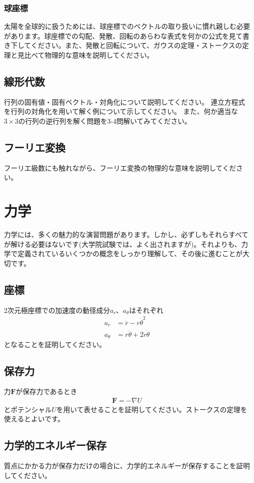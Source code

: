 \documentclass{ltjarticle}
\begin{document}
\subsubsection{球座標}
太陽を全球的に扱うためには、球座標でのベクトルの取り扱いに慣れ親しむ必要があります。球座標での勾配、発散、回転のあらわな表式を何かの公式を見て書き下してください。また、発散と回転について、ガウスの定理・ストークスの定理と見比べて物理的な意味を説明してください。
\subsection{線形代数}
行列の固有値・固有ベクトル・対角化について説明してください。
連立方程式を行列の対角化を用いて解く例について示してください。
また、何か適当な$3\times3$の行列の逆行列を解く問題を3-4問解いてみてください。
\subsection{フーリエ変換}
フーリエ級数にも触れながら、フーリエ変換の物理的な意味を説明してください。
\section{力学}
力学には、多くの魅力的な演習問題があります。しかし、必ずしもそれらすべてが解ける必要はないです(大学院試験では、よく出されますが)。それよりも、力学で定義されているいくつかの概念をしっかり理解して、その後に進むことが大切です。
\subsection{座標}
2次元極座標での加速度の動径成分$a_r$、$a_\theta$はそれぞれ
\begin{align}
    a_r &= \ddot{r} - r\dot{\theta}^2 \\
    a_\theta &= r\ddot{\theta} + 2\dot{r}\dot{\theta}
\end{align}
となることを証明してください。
\subsection{保存力}
力$\bm{F}$が保存力であるとき
\begin{align}
    \bm{F} = - \nabla U
\end{align}
とポテンシャル$U$を用いて表せることを証明してください。ストークスの定理を使えるとよいです。
\subsection{力学的エネルギー保存}
質点にかかる力が保存力だけの場合に、力学的エネルギーが保存することを証明してください。
\end{document}
